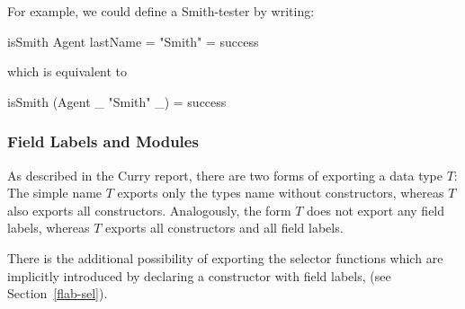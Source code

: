 
\noindent
For example, we could define a Smith-tester by writing:
\begin{curry}
isSmith Agent { lastName = "Smith" } = success
\end{curry}
which is equivalent to
\begin{curry}
isSmith (Agent _ "Smith" _) = success
\end{curry}

\subsubsection{Field Labels and Modules}

As described in the Curry report, there are two forms of
exporting a data type $T$: The simple name $T$ exports only the types name
without constructors, whereas $T$ also exports all
constructors. Analogously, the form $T$ does not export any field labels,
whereas $T$ exports all constructors and all field labels.

There is the additional possibility of exporting the selector functions which
are implicitly introduced by declaring a constructor with field labels,
(see Section~\ref{flab-sel}).

